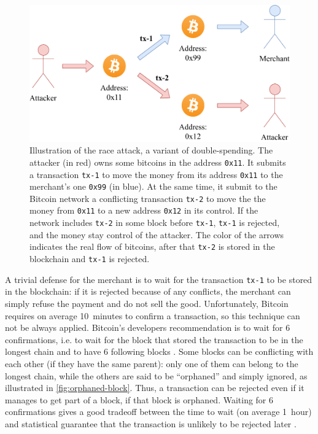 \begin{figure}[t]
	\centering
	\vspace*{0.25cm}
	\includegraphics[scale=0.75]{figures/race_attack}
	\vspace*{0.25cm}
	\caption[Illustration of the race attack, a variant of double-spending.]{
		Illustration of the race attack, a variant of double-spending.
		The attacker (in red) owns some bitcoins in the address \texttt{0x11}.
		It submits a transaction \texttt{tx-1} to move the money from its address \texttt{0x11} to the merchant's one \texttt{0x99} (in blue).
		At the same time, it submit to the Bitcoin network a conflicting transaction \texttt{tx-2} to move the the money from \texttt{0x11} to a new address \texttt{0x12} in its control.
		If the network includes \texttt{tx-2} in some block before \texttt{tx-1}, \texttt{tx-1} is rejected, and the money stay control of the attacker.
		The color of the arrows indicates the real flow of bitcoins, after that \texttt{tx-2} is stored in the blockchain and \texttt{tx-1} is rejected.
	}
	\label{fig:race-attack}
\end{figure}

A trivial defense for the merchant is to wait for the transaction \texttt{tx-1} to be stored in the blockchain:
if it is rejected because of any conflicts, the merchant can simply refuse the payment and do not sell the good.
Unfortunately, Bitcoin requires on average \SI{10}{minutes} to confirm a transaction, so this technique can not be always applied.
Bitcoin's developers recommendation is to wait for \num{6} confirmations, i.e. to wait for the block that stored the transaction to be in the longest chain and to have \num{6} following blocks \cite{confirmation}.
Some blocks can be conflicting with each other (if they have the same parent):
only one of them can belong to the longest chain, while the others are said to be ``orphaned'' \cite{orphaned_block} and simply ignored, as illustrated in \cref{fig:orphaned-block}.
Thus, a transaction can be rejected even if it manages to get part of a block, if that block is orphaned.
Waiting for \num{6} confirmations gives a good tradeoff between the time to wait (on average \SI{1}{hour}) and statistical guarantee that the transaction is unlikely to be rejected later \cite{bitcoin_2009}.


